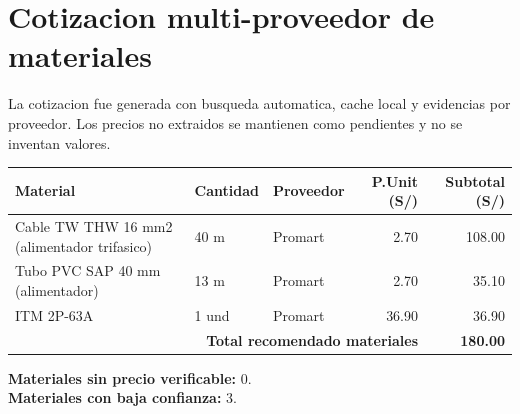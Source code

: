 \section{Cotizacion multi-proveedor de materiales}

La cotizacion fue generada con busqueda automatica, cache local y evidencias por proveedor.
Los precios no extraidos se mantienen como pendientes y no se inventan valores.

\begin{longtable}{p{6.2cm} p{1.8cm} p{2.5cm} r r}
\toprule
\textbf{Material} & \textbf{Cantidad} & \textbf{Proveedor} & \textbf{P.Unit (S/)} & \textbf{Subtotal (S/)} \\
\midrule
Cable TW THW 16 mm2 (alimentador trifasico) & 40 m & Promart & 2.70 & 108.00 \\
Tubo PVC SAP 40 mm (alimentador) & 13 m & Promart & 2.70 & 35.10 \\
ITM 2P-63A & 1 und & Promart & 36.90 & 36.90 \\
\midrule
\multicolumn{4}{r}{\textbf{Total recomendado materiales}} & \textbf{180.00} \\
\bottomrule
\end{longtable}

\noindent\textbf{Materiales sin precio verificable:} 0.\\
\textbf{Materiales con baja confianza:} 3.
